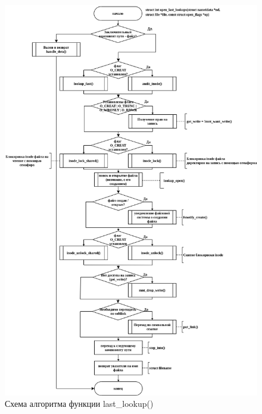 \begin{figure}[H]
	\centering
	\includegraphics[scale=0.47]{assets/open-open_last_lookups.drawio.png}
	\caption{Схема алгоритма функции last\_lookup()}
\end{figure}